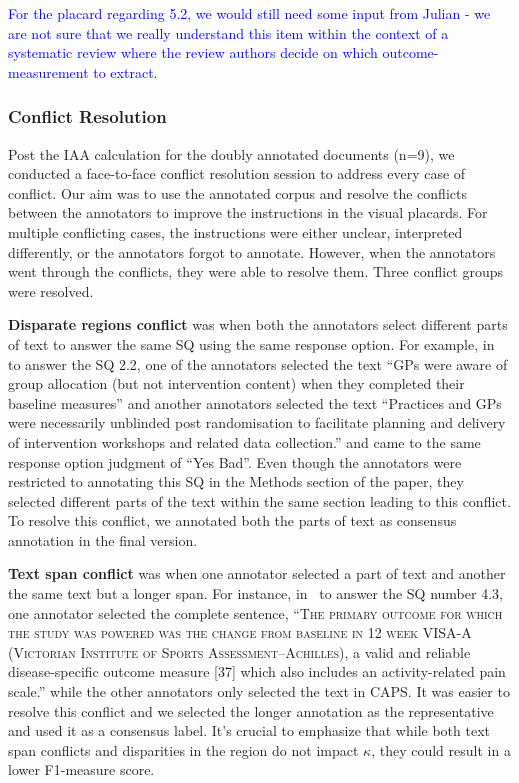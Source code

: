 \documentclass[sn-mathphys,Numbered]{sn-jnl}%
\theoremstyle{thmstyleone}%
\theoremstyle{thmstyletwo}%
\theoremstyle{thmstylethree}%
\begin{document}
\textcolor{blue}{For the placard regarding 5.2, we would still need some input from Julian - we are not sure that we really understand this item within the context of a systematic review where the review authors decide on which outcome-measurement to extract. }
%
%
%
\subsubsection{Conflict Resolution}
\label{dis:conflict}
%
Post the IAA calculation for the doubly annotated documents (n=9), we conducted a face-to-face conflict resolution session to address every case of conflict.
Our aim was to use the annotated corpus and resolve the conflicts between the annotators to improve the instructions in the visual placards.
For multiple conflicting cases, the instructions were either unclear, interpreted differently, or the annotators forgot to annotate.
However, when the annotators went through the conflicts, they were able to resolve them.
Three conflict groups were resolved.

\textbf{Disparate regions conflict} was when both the annotators select different parts of text to answer the same SQ using the same response option.
For example, in~\cite{darlow2019fear} to answer the SQ 2.2, one of the annotators selected the text ``GPs were aware of group allocation (but not intervention content) when they completed their baseline measures'' and another annotators selected the text ``Practices and GPs were necessarily unblinded post randomisation to facilitate planning and delivery of intervention workshops and related data collection.'' and came to the same response option judgment of ``Yes Bad''.
Even though the annotators were restricted to annotating this SQ in the Methods section of the paper, they selected different parts of the text within the same section leading to this conflict.
To resolve this conflict, we annotated both the parts of text as consensus annotation in the final version.


\textbf{Text span conflict} was when one annotator selected a part of text and another the same text but a longer span.
For instance, in~\cite{solomons2020intramuscular} to answer the SQ number 4.3, one annotator selected the complete sentence, ``\textsc{The primary outcome for which the study was powered was the change from baseline in 12 week VISA-A (Victorian Institute of Sports Assessment–Achilles),} a valid and reliable disease-specific outcome measure [37] which also includes an activity-related pain scale.'' while the other annotators only selected the text in CAPS. 
It was easier to resolve this conflict and we selected the longer annotation as the representative and used it as a consensus label.
It's crucial to emphasize that while both text span conflicts and disparities in the region do not impact $\kappa$, they could result in a lower F1-measure score.
\end{document}

